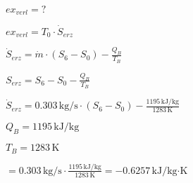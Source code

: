 \( ex_{verl} = ? \)  

\( ex_{verl} = T_0 \cdot \dot{S}_{erz} \)  

\( \dot{S}_{erz} = \dot{m} \cdot (S_6 - S_0) - \frac{Q_B}{T_B} \)  

\( S_{erz} = S_6 - S_0 - \frac{Q_B}{T_B} \)  

\( \dot{S}_{erz} = 0.303 \, \text{kg/s} \cdot (S_6 - S_0) - \frac{1195 \, \text{kJ/kg}}{1283 \, \text{K}} \)  

\( Q_B = 1195 \, \text{kJ/kg} \)  

\( T_B = 1283 \, \text{K} \)  

\( = 0.303 \, \text{kg/s} \cdot \frac{1195 \, \text{kJ/kg}}{1283 \, \text{K}} = -0.6257 \, \text{kJ/kg·K} \)